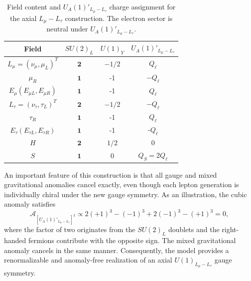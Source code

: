 \documentclass[onecolumn, aps, nofootinbib, prd, preprint, floats, floatfix, amsmath, amssymb, superscriptaddress, preprintnumbers]{revtex4-2}
\begin{document}
\begin{table}[htbp]
    \centering
    \begin{tabular}{cccc}
    \hline
    Field & $SU(2)_L$ & $U(1)_Y$ & $U_A(1)'_{L_\mu-L_\tau}$ \\
    \hline
    $L_{\mu}=\left(\nu_{\mu}, \mu_L\right)^T$ & $\mathbf{2}$ & $-1 / 2$ & $Q_{\ell}$ \\
    \hline
    $\mu_R$ & $\mathbf{1}$ & -1 & $-Q_\ell$ \\
    \hline
    $E_\mu\left(E_{\mu L}, E_{\mu R}\right)$ & $\mathbf{1}$ & -1 & $Q_\ell$\\
    \hline
    $L_{\tau}=\left(\nu_{\tau}, \tau_L\right)^T$ & $\mathbf{2}$ & $-1 / 2$ & $-Q_\ell$ \\
    \hline
    $\tau_R$ & $\mathbf{1}$ & -1 & $Q_\ell$ \\
    \hline
    $E_\tau\left(E_{\tau L}, E_{\tau R}\right)$ & $\mathbf{1}$ & -1 & -$Q_\ell$\\
    \hline
    $H$ & $\mathbf{2}$ & $1 / 2$ & 0 \\
    $S$ & $\mathbf{1}$ & 0 & $Q_S=2Q_\ell$\\
    \hline
    \end{tabular}
    \caption{Field content and $U_A(1)'_{L_\mu-L_\tau}$ charge assignment for the axial $L_\mu-L_\tau$ construction. The electron sector is neutral under $U_A(1)'_{L_\mu-L_\tau}$.}
    \label{tab:charge-assignment}
\end{table}

An important feature of this construction is that all gauge and mixed gravitational anomalies cancel exactly, even though each lepton generation is individually chiral under the new gauge symmetry. As an illustration, the cubic anomaly satisfies \cite{Ismail:2016tod}
\begin{equation}
\mathcal{A}_{[U_A(1)'_{L_\mu-L_\tau}]^3}
\propto
2(+1)^3
-(-1)^3
+2(-1)^3
-(+1)^3
=0,
\end{equation}
where the factor of two originates from the $SU(2)_L$ doublets and the right-handed fermions contribute with the opposite sign. The mixed gravitational anomaly cancels in the same manner. Consequently, the model provides a renormalizable and anomaly-free realization of an axial $U(1)_{L_\mu-L_\tau}$ gauge symmetry.
\end{document}
